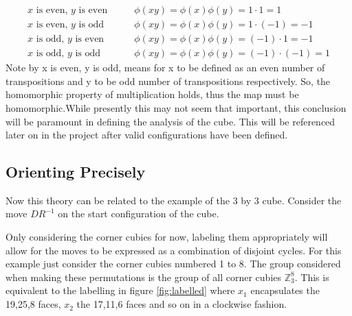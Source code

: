 \documentclass{article}
\newcounter{theo}[section]\setcounter{theo}{0}
\newcounter{prop}[section]\setcounter{prop}{0}
\begin{document}
\begin{align*}
\text{$x$ is even, $y$ is even} \qquad	&\phi(xy) = \phi(x)\phi(y) = 1\cdot1 = 1\\
\text{$x$ is even, $y$ is odd} \qquad	&\phi(xy) = \phi(x)\phi(y)= 1\cdot(-1) = -1\\
\text{$x$ is odd, $y$ is even} \qquad	&\phi(xy) = \phi(x)\phi(y)= (-1)\cdot1 = -1\\
\text{$x$ is odd, $y$ is odd} \qquad	&\phi(xy) = \phi(x)\phi(y) = (-1)\cdot(-1) = 1
\end{align*}
Note by x is even, y is odd, means for x to be defined as an even number of transpositions and y to be odd number of transpositions respectively. So, the homomorphic property of multiplication holds, thus the map must be homomorphic.\newline While presently this may not seem that important, this conclusion will be paramount in defining the analysis of the cube. This will be referenced later on in the project after valid configurations have been defined.


\newpage
\subsection{Orienting Precisely}

Now this theory can be related to the example of the 3 by 3 cube. Consider the move $DR^{-1}$ on the start configuration of the cube.


\begin{figure}[hbt]
\centering%
  \RubikCubeSolved%
    \hspace{.4cm}
    \quad{}%
    \hspace{.4cm}
  	\hspace{.4cm}
    \quad{}%
    \hspace{.4cm}
\end{figure}
Only considering the corner cubies for now, labeling them appropriately will allow for the moves to be expressed as a combination of disjoint cycles. For this example just consider the corner cubies numbered 1 to 8. The group considered when making these permutations is the group of all corner cubies $\mathbb{Z}_{3}^{8}$. This is equivalent to the labelling in figure \ref{fig:labelled} where $x_1$ encapsulates the 19,25,8 faces, $x_2$ the 17,11,6 faces and so on in a clockwise fashion.
\end{document}
